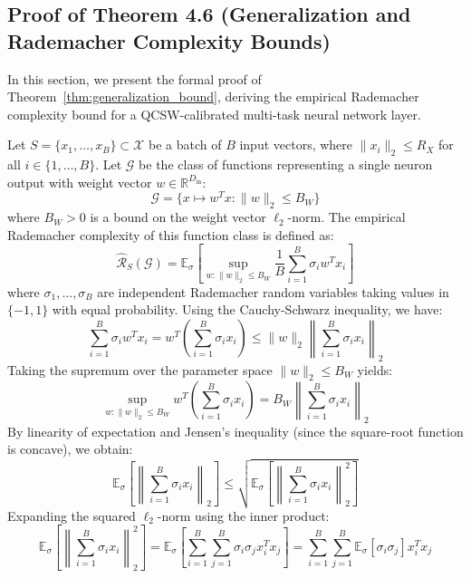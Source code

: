 \documentclass{article}
\theoremstyle{plain}
\theoremstyle{definition}
\theoremstyle{remark}
\begin{document}
\subsection{Proof of Theorem 4.6 (Generalization and Rademacher Complexity Bounds)}
\label{sec:appendix_generalization_proof}
In this section, we present the formal proof of Theorem~\ref{thm:generalization_bound}, deriving the empirical Rademacher complexity bound for a QCSW-calibrated multi-task neural network layer.

Let $S = \{x_1, \dots, x_B\} \subset \mathcal{X}$ be a batch of $B$ input vectors, where $\|x_i\|_2 \le R_X$ for all $i \in \{1, \dots, B\}$. Let $\mathcal{G}$ be the class of functions representing a single neuron output with weight vector $w \in \mathbb{R}^{D_{\text{in}}}$:
\begin{equation}
\mathcal{G} = \{ x \mapsto w^T x : \|w\|_2 \le B_W \}
\end{equation}
where $B_W > 0$ is a bound on the weight vector $\ell_2$-norm. The empirical Rademacher complexity of this function class is defined as:
\begin{equation}
\widehat{\mathcal{R}}_S(\mathcal{G}) = \mathbb{E}_{\sigma} \left[ \sup_{w : \|w\|_2 \le B_W} \frac{1}{B} \sum_{i=1}^B \sigma_i w^T x_i \right]
\end{equation}
where $\sigma_1, \dots, \sigma_B$ are independent Rademacher random variables taking values in $\{-1, 1\}$ with equal probability. Using the Cauchy-Schwarz inequality, we have:
\begin{equation}
\sum_{i=1}^B \sigma_i w^T x_i = w^T \left( \sum_{i=1}^B \sigma_i x_i \right) \le \|w\|_2 \left\| \sum_{i=1}^B \sigma_i x_i \right\|_2
\end{equation}
Taking the supremum over the parameter space $\|w\|_2 \le B_W$ yields:
\begin{equation}
\sup_{w : \|w\|_2 \le B_W} w^T \left( \sum_{i=1}^B \sigma_i x_i \right) = B_W \left\| \sum_{i=1}^B \sigma_i x_i \right\|_2
\end{equation}
By linearity of expectation and Jensen's inequality (since the square-root function is concave), we obtain:
\begin{equation}
\mathbb{E}_{\sigma} \left[ \left\| \sum_{i=1}^B \sigma_i x_i \right\|_2 \right] \le \sqrt{ \mathbb{E}_{\sigma} \left[ \left\| \sum_{i=1}^B \sigma_i x_i \right\|_2^2 \right] }
\end{equation}
Expanding the squared $\ell_2$-norm using the inner product:
\begin{equation}
\mathbb{E}_{\sigma} \left[ \left\| \sum_{i=1}^B \sigma_i x_i \right\|_2^2 \right] = \mathbb{E}_{\sigma} \left[ \sum_{i=1}^B \sum_{j=1}^B \sigma_i \sigma_j x_i^T x_j \right] = \sum_{i=1}^B \sum_{j=1}^B \mathbb{E}_{\sigma}[\sigma_i \sigma_j] x_i^T x_j
\end{equation}
\end{document}
